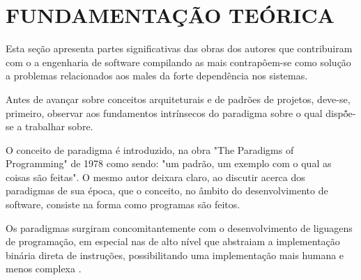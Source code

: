 


\section{\textbf{FUNDAMENTAÇÃO TEÓRICA}}
    \label{cha:fundamentacao-teorica}



    Esta seção apresenta partes significativas das obras dos autores que contribuiram
    com o a engenharia de software compilando as mais contrapôem-se como solução a
    problemas relacionados aos males da forte dependência nos sistemas.

    Antes de avançar sobre conceitos arquiteturais e de padrões de projetos, deve-se, primeiro,
    observar aos fundamentos intrínsecos do paradigma sobre o qual dispṍe-se a trabalhar sobre.
    
    O conceito de paradigma é introduzido, na obra "The Paradigms of Programming"
    \parencite{floyd2007paradigms} de 1978 como sendo: "um padrão, um exemplo com o qual
    as coisas são feitas". O mesmo autor deixara claro, ao discutir acerca dos paradigmas
    de sua época, que o conceito, no âmbito do desenvolvimento de software, consiste na forma como 
    programas são feitos.

    Os paradigmas surgiram concomitantemente com o desenvolvimento de liguagens de
    programação, em especial nas de alto nível que abstraiam a implementação binária
    direta de instruções, possibilitando uma implementação mais humana e menos complexa
    \textcite[p.~8-]{Sammet1969languages}.


